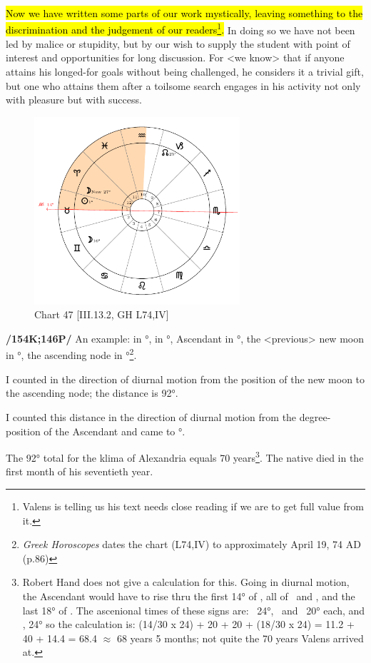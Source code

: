\hl{Now we have written some parts of our work mystically, leaving something to the discrimination and the judgement of our readers\footnote{Valens is telling us his text needs close reading if we are to get full value from it.}.} In doing so we have not been led by malice or stupidity, but by our wish to supply the student with point of interest and opportunities for long discussion. For <we know> that if anyone attains his longed-for goals without being challenged, he considers it a trivial gift, but one
who attains them after a toilsome search engages in his activity not only with pleasure but with success.

\newpage
\clearpage
\begin{figure}
\centering
\vspace{-20pt}
\includegraphics[width=0.68\textwidth]{charts/3_13_2}
\caption{Chart 47 [III.13.2, GH L74,IV]}
\label{fig:chart47}
\end{figure}

\noindent \textbf{/154K;146P/} An example: \Sun\xspace in \Taurus\xspace 1°, \Moon\xspace in \Gemini\xspace 16°, Ascendant in \Taurus\xspace 14°, the <previous> new moon in \Aries\xspace 27°, the ascending node in \Capricorn\xspace 25°\footnote{\textit{Greek Horoscopes} dates the chart (L74,IV) to approximately April 19, 74 AD (p.86)}.

I counted in the direction of diurnal motion from the position of the new moon to the ascending node; the distance is 92°. 

I counted this distance in the direction of diurnal motion from the degree-position of the Ascendant and came to \Aquarius\xspace 12°. 

The 92° total for the klima of Alexandria equals 70 years\footnote{Robert Hand does not give a calculation for this. Going in diurnal motion, the Ascendant would have to rise thru the first 14° of \Taurus, all of \Aries\, and \Pisces, and the last 18° of \Aquarius. The ascenional times of these signs are: \Taurus\, 24°,  \Aries\, and \Pisces\, 20° each, and \Aquarius, 24° so the calculation is: (14/30 x 24) + 20 + 20 + (18/30 x 24) = 11.2 + 40 + 14.4 = 68.4 $\approx$ 68 years 5 months; not quite the 70 years Valens arrived at.}. The native died in the first month of his seventieth year. 

